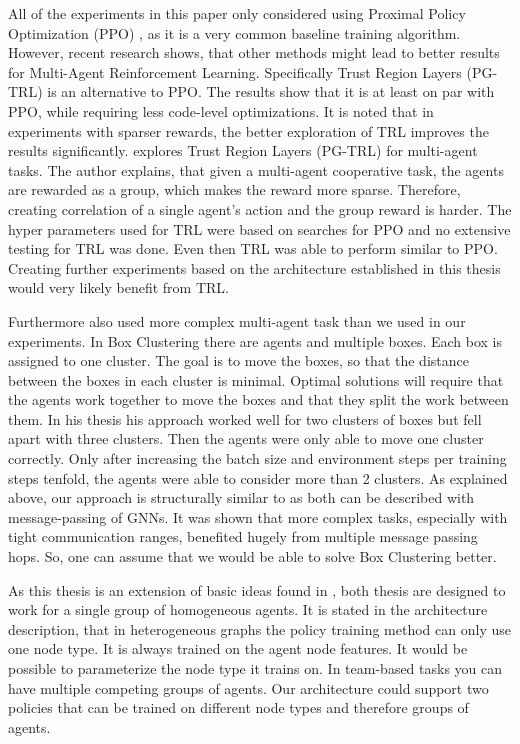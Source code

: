 All of the experiments in this paper only considered using Proximal Policy Optimization (PPO) \citet{SchulmanWDRK17}, as it is a very common baseline training algorithm.
However, recent research shows, that other methods might lead to better results for Multi-Agent Reinforcement Learning.
Specifically Trust Region Layers (PG-TRL) \citet{otto2021differentiable} is an alternative to PPO. The results show that it is at least on par with PPO, while requiring less code-level optimizations. It is noted that in experiments with sparser rewards, the better exploration of TRL improves the results significantly.
\citet{RobinRuede2021} explores Trust Region Layers (PG-TRL) \citep{otto2021differentiable} for multi-agent tasks. The author explains, that given a multi-agent cooperative task, the agents are rewarded as a group, which makes the reward more sparse. Therefore, creating correlation of a single agent's action and the group reward is harder. The hyper parameters used for TRL were based on searches for PPO and no extensive testing for TRL was done. Even then TRL was able to perform similar to PPO.\\
Creating further experiments based on the architecture established in this thesis would very likely benefit from TRL. \par

Furthermore \citet{RobinRuede2021} also used more complex multi-agent task than we used in our experiments. In Box Clustering there are agents and multiple boxes. Each box is assigned to one cluster. The goal is to move the boxes, so that the distance between the boxes in each cluster is minimal. Optimal solutions will require that the agents work together to move the boxes and that they split the work between them. In his thesis his approach worked well for two clusters of boxes but fell apart with three clusters. Then the agents were only able to move one cluster correctly. Only after increasing the batch size and environment steps per training steps tenfold, the agents were able to consider more than 2 clusters. As explained above, our approach is structurally similar to \citet{RobinRuede2021} as both can be described with message-passing of GNNs. It was shown that more complex tasks, especially with tight communication ranges, benefited hugely from multiple message passing hops. So, one can assume that we would be able to solve Box Clustering better.\par

As this thesis is an extension of basic ideas found in \citet{RobinRuede2021}, both thesis are designed to work for a single group of homogeneous agents. It is stated in the architecture description, that in heterogeneous graphs the policy training method can only use one node type. It is always trained on the agent node features. It would be possible to parameterize the node type it trains on. In team-based tasks you can have multiple competing groups of agents. Our architecture could support two policies that can be trained on different node types and therefore groups of agents. \par

